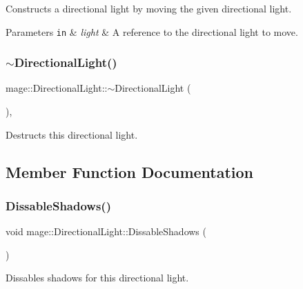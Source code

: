 Constructs a directional light by moving the given directional light.


\begin{DoxyParams}[1]{Parameters}
\mbox{\tt in}  & {\em light} & A reference to the directional light to move. \\
\hline
\end{DoxyParams}
\hypertarget{classmage_1_1_directional_light_a967d33c11a1477c01ce4c9720337caeb}{}\label{classmage_1_1_directional_light_a967d33c11a1477c01ce4c9720337caeb} 
\subsubsection{\texorpdfstring{$\sim$\+Directional\+Light()}{~DirectionalLight()}}
{\footnotesize\ttfamily mage\+::\+Directional\+Light\+::$\sim$\+Directional\+Light (\begin{DoxyParamCaption}{ }\end{DoxyParamCaption})\hspace{0.3cm}{\ttfamily [virtual]}, {\ttfamily [default]}}

Destructs this directional light. 

\subsection{Member Function Documentation}
\hypertarget{classmage_1_1_directional_light_addd4803dee85892dfd57f51e155c6572}{}\label{classmage_1_1_directional_light_addd4803dee85892dfd57f51e155c6572} 
\subsubsection{\texorpdfstring{Dissable\+Shadows()}{DissableShadows()}}
{\footnotesize\ttfamily void mage\+::\+Directional\+Light\+::\+Dissable\+Shadows (\begin{DoxyParamCaption}{ }\end{DoxyParamCaption})\hspace{0.3cm}{\ttfamily [noexcept]}}

Dissables shadows for this directional light. \hypertarget{classmage_1_1_directional_light_a36436d5d99ccf6a0e49e81f26c3f9bc7}{}\label{classmage_1_1_directional_light_a36436d5d99ccf6a0e49e81f26c3f9bc7} 

